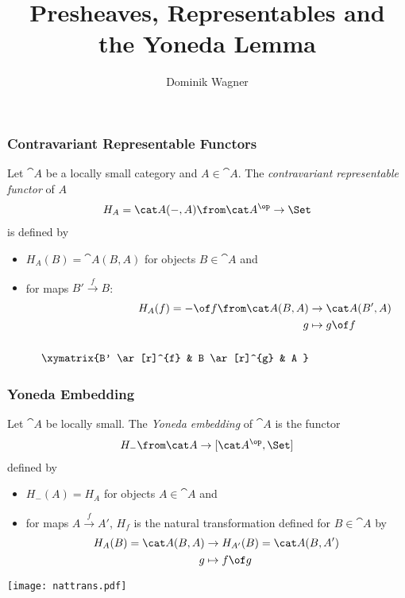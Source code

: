 \documentclass{beamer}
\title{Presheaves, Representables and\\the Yoneda Lemma}
\author{Dominik Wagner}
\begin{document}
\frame{\titlepage}

\begin{frame}
  \frametitle{Contravariant Representable Functors}
  
  Let $\cat A$ be a locally small category and $A\in \cat A$. The \emph{contravariant representable functor} of $A$
  \begin{align*}
    H_A=\cat A(-,A)\from \cat A^\op\to \Set
  \end{align*}
  is defined by
  \begin{itemize}
  \item $H_A(B)=\cat A(B,A)$ for objects $B\in\cat A$ and
  \item for maps $B'\xrightarrow{f} B$:
    \begin{align*}
      H_A(f)=-\of f\from \cat A(B,A)&\to \cat A(B',A)\\
                                      g &\mapsto g\of f\\\\
      \xymatrix{B' \ar[r]^{f} & B \ar[r]^{g} & A }
    \end{align*}
  \end{itemize}
\end{frame}

\begin{frame}
  \frametitle{Yoneda Embedding}
  Let $\cat A$ be locally small. The \emph{Yoneda embedding} of $\cat A$ is the functor
  \begin{align*}
    H_-\from \cat A\to[\cat A^\op,\Set]
  \end{align*}
  defined by
  \begin{itemize}
  \item $H_-(A)=H_A$ for objects $A\in\cat A$ and
  \item for maps $A\xrightarrow{f}A'$, $H_f$ is the natural transformation defined for $B\in \cat A$ by
    \begin{align*}
      H_A(B)=\cat A(B,A)&\to H_{A'}(B)=\cat A(B,A')\\
      g&\mapsto  f\of g\\
    \end{align*}
  \end{itemize}
  \vspace{-0.8cm}
  \texttt{[image: nattrans.pdf]}
\end{frame}
\end{document}
